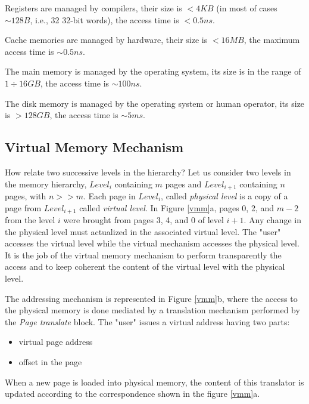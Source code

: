 
Registers  are managed by compilers, their size is $< 4KB$ (in most of cases $\sim 128B$, i.e., 32 32-bit words), the access time is $< 0.5 ns$.

Cache memories are managed by hardware, their size is $< 16MB$, the maximum access time is $\sim 0.5 ns$.

The main memory is managed by the operating system, its size is in the range of $1 \div 16 GB$, the access time is $\sim 100 ns$.

The disk memory is managed by the operating system or human operator, its size is $> 128GB$, the access time is $\sim 5 ms$.

\subsection{Virtual Memory Mechanism}

How relate two successive levels in the hierarchy? Let us consider two levels in the memory hierarchy, $Level_i$ containing $m$ pages and $Level_{i+1}$ containing $n$ pages, with $n >> m$. Each page in $Level_i$, called {\em physical level} is a copy of a page from $Level_{i+1}$ called {\em virtual level}. In Figure \ref{vmm}a, pages 0, 2, and $m-2$ from the level $i$ were brought from pages 3, 4, and 0 of level $i+1$. Any change in the physical level must actualized in the associated virtual level. The "user"  accesses the virtual level while the virtual mechanism accesses the physical level. It is the job of the virtual memory mechanism to perform transparently the access and to keep coherent the content of the virtual level with the physical level.



The addressing mechanism is represented in Figure \ref{vmm}b, where the access to the physical memory is done mediated by a translation mechanism performed by the {\em Page translate} block.  The "user" issues a virtual address having two parts:
\begin{itemize}
    \item virtual page address
    \item offset in the page
\end{itemize}
When a new page is loaded into physical memory, the content of this translator is updated according to the correspondence shown in the figure \ref{vmm}a.


